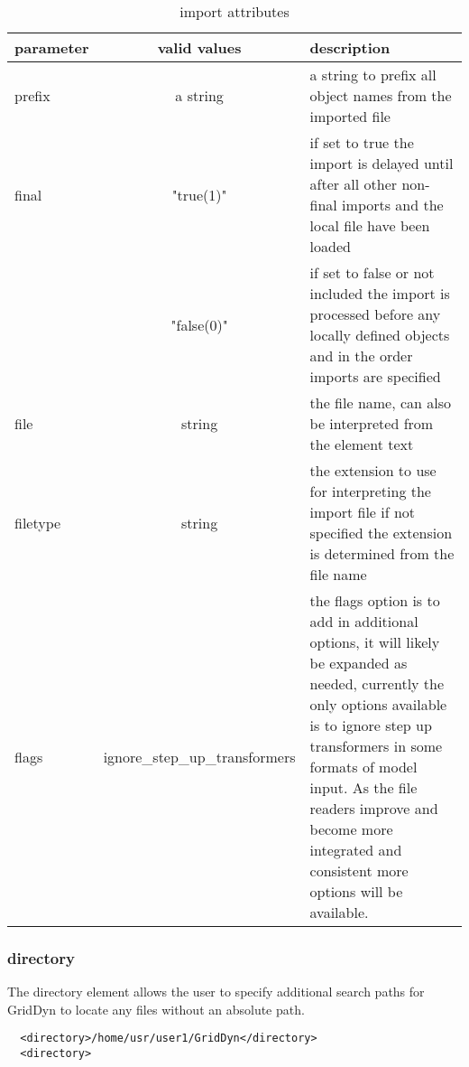 \documentclass[12pt]{article} %
\begin{document}
   \begin{table}[ht]

       \caption{import attributes} %
       \centering %
       \begin{tabular}{l c p{8cm}} %
           \hline %
           parameter & valid values & description \\ [0.5ex] %
           \hline %
           prefix & a string & a string to prefix all object names from the imported file \\ %
           final & "true(1)"  & if set to true the import is delayed until after all other non-final imports and the local file have been loaded\\
           & "false(0)"&  if set to false or not included the import is processed before any locally defined objects and in the order imports are specified \\
           file & string & the file name, can also be interpreted from the element text  \\
           filetype & string & the extension to use for interpreting the import file if not specified the extension is determined from the file name \\
           flags & ignore\_step\_up\_transformers & the flags option is to add in additional options, it will likely be expanded as needed, currently the only options available is to ignore step up transformers in some formats of model input.  As the file readers improve and become more integrated and consistent more options will be available.  \\
           \hline %
       \end{tabular}
       \label{table:importOptions}
   \end{table}

  \subsubsection{directory}
  The directory element allows the user to specify additional search paths for GridDyn to locate any files without an absolute path.
  \begin{verbatim}
  <directory>/home/usr/user1/GridDyn</directory>
  <directory>
  \end{verbatim}

  \clearpage
\end{document}
